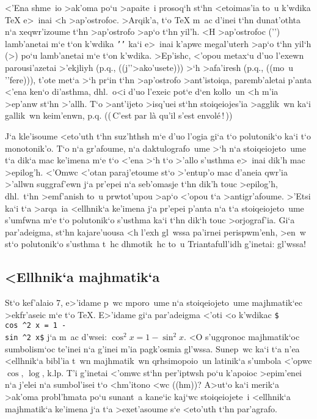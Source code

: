 <'Ena shme~io >ak'oma po`u >apaite~i prosoq`h st`hn <etoimas'ia to~u
k'wdika {\rm\TeX} e>~inai <h >ap'o\-stro\-foc.  >Arqik'a, t`o
{\rm\TeX} m~ac d'inei t`hn dunat'othta n`a xeqwr'izoume t`hn >ap'ostrofo
>ap`o t`hn yil'h. <H >ap'ostrofoc  ('') lamb'anetai m`e t`on k'wdika
{\tt'{}'} ka`i e>~inai k'apwc megal'uterh >ap`o t`hn yil`h (>) po`u
lamb'anetai m`e t`on k'wdika\NB{\tt>}.  >Ep'ishc, <'opou metax`u d'uo
l'exewn parousi'azetai >'ekjliyh (p.q., ((j''\NB>ako'usete)){}) >`h
>afa'iresh (p.q., ((mo~u ''fere)){}), t'ote met`a >`h pr`in t`hn
>ap'ostrofo >ant'istoiqa, paremb'aletai p'anta <'ena ken`o di'asthma,
dhl.\ o<i d'uo l'exeic pot`e d`en kollo~un <h m'ia >ep'anw st`hn >'allh.
 T`o >ant'ijeto >isq'uei st`hn stoiqeiojes'ia >agglik~wn ka`i gallik~wn
keim'enwn, p.q. (({\rm$\,$C'est par l\`a qu'il s'est
envol\'e$\,$!}$\,$))

J`a kle'isoume <eto'uth t`hn suz'hthsh m`e d'uo l'ogia gi`a t`o
polutonik`o ka`i t`o monotonik'o.  T`o n`a gr'afoume, n`a
daktulografo~ume >`h n`a stoiqeiojeto~ume t`a dik`a mac ke'imena m`e t`o
<'ena >`h t`o >'allo s'usthma e>~inai dik'h mac >epilog'h.  <'Omwc
<'otan paraj'etoume st`o >'entup'o mac d'aneia qwr'ia >'allwn
suggraf'ewn j`a pr'epei n`a seb'omasje t`hn dik'h touc >epilog'h, dhl.\
t`hn >emf'anish to~u prwtot'upou >ap`o <'opou t`a >antigr'afoume. 
>'Etsi ka`i t`a >arqa~ia <ellhnik`a ke'imena j`a pr'epei p'anta n`a t`a
stoiqeiojeto~ume s'umfwna m`e t`o polutonik`o s'usthma ka`i t`hn dik`h
touc >orjograf'ia. Gi`a par'adeigma, st`hn kajare'uousa <h l'exh {\tengs
gl~wssa\/} pa'irnei perispwm'enh, >en~w st`o polutonik`o s'usthma t~hc
dhmotik~hc to~u Triantafull'idh g'inetai: {\tengs gl'wssa\/}!

\subsection{<Ellhnik`a majhmatik`a}

St`o kef'alaio 7, e>'idame p~wc mporo~ume n`a stoiqeiojeto~ume
majhmatik`ec >ekfr'aseic m`e t`o {\rm \TeX}\null.  E>'idame gi`a
par'adeigma <'oti <o k'wdikac {\tt\$\\cos \^{}2 x = 1 - \\sin \^{}2 x\$}
j`a m~ac d'wsei: $\cos^2 x = 1 - \sin^2 x$\null.  <O  s'ugqronoc
majhmatik`oc sumbolism`oc te'inei n`a g'inei m'ia pagk'osmia gl'wssa.
Sunep~wc ka`i t`a n'ea <ellhnik`a bibl'ia t~wn majhmatik~wn
qrhsimopoio~un latinik`a s'umbola <'opwc $\cos$, $\log$, k.lp.  T'i
g'inetai <'omwc st`hn per'iptwsh po`u k'apoioc >epim'enei n`a j'elei n`a
sumbol'isei t`o <hm'itono <wc ((hm))?  A>ut`o ka`i merik`a >ak'oma
probl'hmata po`u sunant~a kane`ic kaj`wc stoiqeiojete~i <ellhnik`a
majhmatik`a ke'imena j`a t`a >exet'asoume s`e <eto'uth t`hn par'agrafo. 

